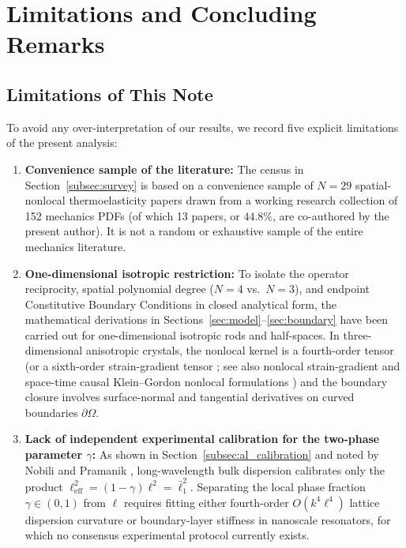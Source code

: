 \section{Limitations and Concluding Remarks}\label{sec:limitations}

\subsection{Limitations of This Note}\label{subsec:limitations}

To avoid any over-interpretation of our results, we record five explicit limitations of the present analysis:
\begin{enumerate}[leftmargin=*,align=left]
  \item \textbf{Convenience sample of the literature:} The census in Section~\ref{subsec:survey} is based on a convenience sample of $N=29$ spatial-nonlocal thermoelasticity papers drawn from a working research collection of 152 mechanics PDFs (of which 13 papers, or $44.8\%$, are co-authored by the present author). It is not a random or exhaustive sample of the entire mechanics literature.
  \item \textbf{One-dimensional isotropic restriction:} To isolate the operator reciprocity, spatial polynomial degree ($N=4$ vs.\ $N=3$), and endpoint Constitutive Boundary Conditions in closed analytical form, the mathematical derivations in Sections~\ref{sec:model}--\ref{sec:boundary} have been carried out for one-dimensional isotropic rods and half-spaces. In three-dimensional anisotropic crystals, the nonlocal kernel is a fourth-order tensor (or a sixth-order strain-gradient tensor \cite{Lazar2022}; see also nonlocal strain-gradient \cite{LimZhangReddy2015} and space-time causal Klein--Gordon nonlocal formulations \cite{LazarAgiasofitou2022KG}) and the boundary closure involves surface-normal and tangential derivatives on curved boundaries $\partial\Omega$.
  \item \textbf{Lack of independent experimental calibration for the two-phase parameter $\gamma$:} As shown in Section~\ref{subsec:al_calibration} and noted by Nobili and Pramanik \cite{NobiliPramanik2025b}, long-wavelength bulk dispersion calibrates only the product $\ell_{\mathrm{eff}}^2 = (1-\gamma)\ell^2 = \bar{\ell}_1^2$. Separating the local phase fraction $\gamma \in (0,1)$ from $\ell$ requires fitting either fourth-order $O(k^4\ell^4)$ lattice dispersion curvature or boundary-layer stiffness in nanoscale resonators, for which no consensus experimental protocol currently exists.

\end{enumerate}
